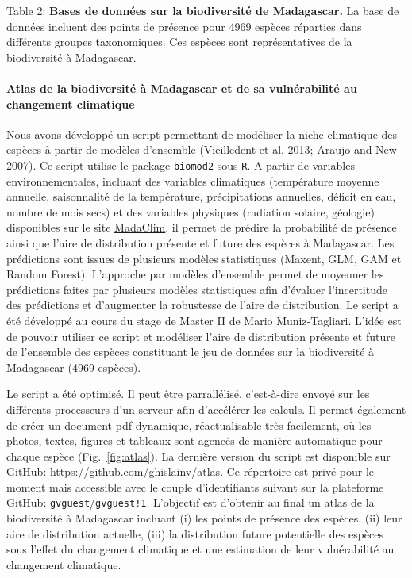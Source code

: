 \documentclass[12pt,]{article}
\let\oldparagraph\paragraph
\renewcommand{\paragraph}[1]{\oldparagraph{#1}\mbox{}}
\begin{document}
Table 2: \textbf{Bases de données sur la biodiversité de Madagascar.} La
base de données incluent des points de présence pour 4969 espèces
réparties dans différents groupes taxonomiques. Ces espèces sont
représentatives de la biodiversité à Madagascar.

\hypertarget{atlas-de-la-biodiversite-a-madagascar-et-de-sa-vulnerabilite-au-changement-climatique-1}{%
\paragraph{Atlas de la biodiversité à Madagascar et de sa vulnérabilité
au changement
climatique}\label{atlas-de-la-biodiversite-a-madagascar-et-de-sa-vulnerabilite-au-changement-climatique-1}}

Nous avons développé un script permettant de modéliser la niche
climatique des espèces à partir de modèles d'ensemble (Vieilledent et
al. 2013; Araujo and New 2007). Ce script utilise le package
\texttt{biomod2} sous \texttt{R}. A partir de variables
environnementales, incluant des variables climatiques (température
moyenne annuelle, saisonnalité de la température, précipitations
annuelles, déficit en eau, nombre de mois secs) et des variables
physiques (radiation solaire, géologie) disponibles sur le site
\href{https://madaclim.cirad.fr}{MadaClim}, il permet de prédire la
probabilité de présence ainsi que l'aire de distribution présente et
future des espèces à Madagascar. Les prédictions sont issues de
plusieurs modèles statistiques (Maxent, GLM, GAM et Random Forest).
L'approche par modèles d'ensemble permet de moyenner les prédictions
faites par plusieurs modèles statistiques afin d'évaluer l'incertitude
des prédictions et d'augmenter la robustesse de l'aire de distribution.
Le script a été développé au cours du stage de Master II de Mario
Muniz-Tagliari. L'idée est de pouvoir utiliser ce script et modéliser
l'aire de distribution présente et future de l'ensemble des espèces
constituant le jeu de données sur la biodiversité à Madagascar (4969
espèces).

Le script a été optimisé. Il peut être parrallélisé, c'est-à-dire envoyé
sur les différents processeurs d'un serveur afin d'accélérer les
calculs. Il permet également de créer un document pdf dynamique,
réactualisable très facilement, où les photos, textes, figures et
tableaux sont agencés de manière automatique pour chaque espèce
(Fig.~\ref{fig:atlas}). La dernière version du script est disponible sur
GitHub: \url{https://github.com/ghislainv/atlas}. Ce répertoire est
privé pour le moment mais accessible avec le couple d'identifiants
suivant sur la plateforme GitHub: \texttt{gvguest}/\texttt{gvguest!1}.
L'objectif est d'obtenir au final un atlas de la biodiversité à
Madagascar incluant (i) les points de présence des espèces, (ii) leur
aire de distribution actuelle, (iii) la distribution future potentielle
des espèces sous l'effet du changement climatique et une estimation de
leur vulnérabilité au changement climatique.
\end{document}
